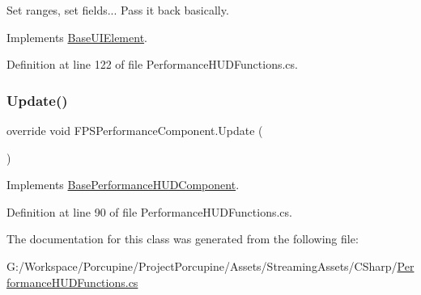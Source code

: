 Set ranges, set fields... Pass it back basically. 



Implements \hyperlink{class_base_u_i_element_a9a0aa6ac0b194f90e092b372adce4e30}{Base\+U\+I\+Element}.



Definition at line 122 of file Performance\+H\+U\+D\+Functions.\+cs.

\mbox{\label{class_f_p_s_performance_component_adf1034c8ddd444a0321d107159d85794}} 
\subsubsection{\texorpdfstring{Update()}{Update()}}
{\footnotesize\ttfamily override void F\+P\+S\+Performance\+Component.\+Update (\begin{DoxyParamCaption}{ }\end{DoxyParamCaption})\hspace{0.3cm}{\ttfamily [virtual]}}



Implements \hyperlink{class_base_performance_h_u_d_component_a7a585b4c22bd5b3daee51bf126fa1cec}{Base\+Performance\+H\+U\+D\+Component}.



Definition at line 90 of file Performance\+H\+U\+D\+Functions.\+cs.



The documentation for this class was generated from the following file\+:\begin{DoxyCompactItemize}
\item 
G\+:/\+Workspace/\+Porcupine/\+Project\+Porcupine/\+Assets/\+Streaming\+Assets/\+C\+Sharp/\hyperlink{_performance_h_u_d_functions_8cs}{Performance\+H\+U\+D\+Functions.\+cs}\end{DoxyCompactItemize}
